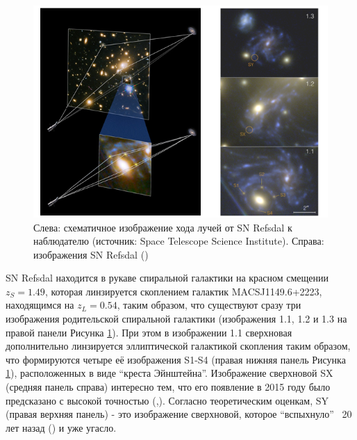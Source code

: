 \begin{figure}[h!]
    \centering
	\includegraphics[scale=0.8]{pics/snrefsdal.png}
	\caption{Слева: схематичное изображение хода лучей от SN Refsdal к  наблюдателю (источник: Space Telescope Science Institute). Справа: изображения SN Refsdal (\cite{treu2015}) \label{fig:snrefsdalfig}}
\end{figure}

SN Refsdal находится в рукаве спиральной галактики на красном смещении $z_S= 1.49$, которая линзируется скоплением галактик MACSJ1149.6+2223, находящимся на $z_L= 0.54$, таким образом, что существуют сразу три изображения родительской спиральной галактики (изображения 1.1, 1.2 и 1.3 на правой панели Рисунка \ref{fig:snrefsdalfig}). При этом в изображении 1.1 сверхновая дополнительно линзируется эллиптической галактикой скопления таким образом, что формируются четыре её изображения S1-S4 (правая нижняя панель Рисунка \ref{fig:snrefsdalfig}), расположенных в виде “креста Эйнштейна”. Изображение сверхновой SX (средняя панель справа) интересно тем, что его появление в 2015 году было предсказано с высокой точностью (\cite{kelly2014},\cite{treu2015}). Согласно теоретическим оценкам, SY (правая верхняя панель) - это изображение сверхновой, которое “вспыхнуло” ~20 лет назад (\cite{kelly2014}) и уже угасло.
